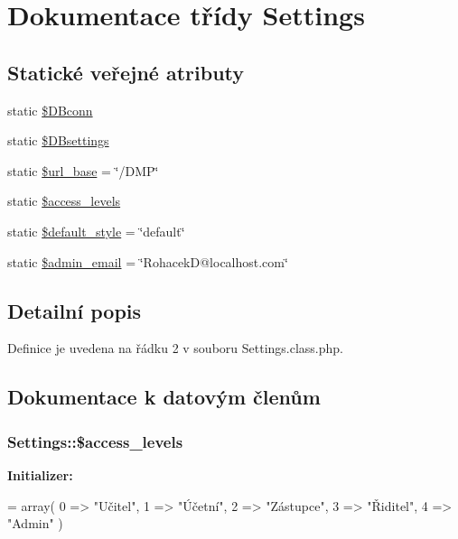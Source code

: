 \hypertarget{class_settings}{\section{Dokumentace třídy Settings}
\label{class_settings}
}
\subsection*{Statické veřejné atributy}
\begin{DoxyCompactItemize}
\item 
static \hyperlink{class_settings_ae66c8f793cb922e441952393ff4d6168}{\$\-D\-Bconn}
\item 
static \hyperlink{class_settings_ad53d9811a9ab524a05cf3a1badc50b70}{\$\-D\-Bsettings}
\item 
static \hyperlink{class_settings_ab4d5556c37e88ee59e06e8c409e8bcd1}{\$url\-\_\-base} = \char`\"{}/D\-M\-P\char`\"{}
\item 
static \hyperlink{class_settings_a92bf988b87f175aaa87628e44943fb07}{\$access\-\_\-levels}
\item 
static \hyperlink{class_settings_a0fa5d232ec562cfdd51abcb478096a62}{\$default\-\_\-style} = \char`\"{}default\char`\"{}
\item 
static \hyperlink{class_settings_af85847d3f54cbc385315fc9006892694}{\$admin\-\_\-email} = \char`\"{}Rohacek\-D@localhost.\-com\char`\"{}
\end{DoxyCompactItemize}


\subsection{Detailní popis}


Definice je uvedena na řádku 2 v souboru Settings.\-class.\-php.



\subsection{Dokumentace k datovým členům}
\hypertarget{class_settings_a92bf988b87f175aaa87628e44943fb07}{
\subsubsection[{\$access\-\_\-levels}]{\setlength{\rightskip}{0pt plus 5cm}Settings\-::\$access\-\_\-levels\hspace{0.3cm}{\ttfamily [static]}}}\label{class_settings_a92bf988b87f175aaa87628e44943fb07}
{\bfseries Initializer\-:}
\begin{DoxyCode}
= array(
        0   =>  \textcolor{stringliteral}{"Učitel"},
        1   =>  \textcolor{stringliteral}{"Účetní"},
        2   =>  \textcolor{stringliteral}{"Zástupce"},
        3   =>  \textcolor{stringliteral}{"Řiditel"},
        4   =>  \textcolor{stringliteral}{"Admin"}
    )
\end{DoxyCode}


